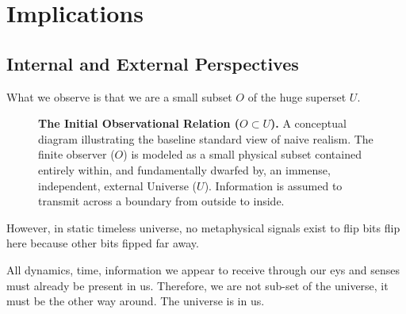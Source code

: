 \chapter{Implications}
\label{chap:implications}

\section{Internal and External Perspectives}

What we observe is that we are a small subset $O$ of  the huge superset $U$.

\begin{figure}[htbp]
\centering
{}
\caption{\textbf{The Initial Observational Relation ($O \subset U$).}
  A conceptual diagram illustrating the baseline standard view of naive realism.
  The finite observer ($O$) is modeled as a small physical subset contained entirely within, and fundamentally dwarfed by, an immense, independent, external Universe ($U$).
  Information is assumed to transmit across a boundary from outside to inside.}
\label{fig:diag1}
\end{figure}

\newpage

However, in static timeless universe, no metaphysical
signals exist to flip bits flip here because other bits fipped far away. 

All dynamics, time, information we appear to receive through our eys and senses
must already be present in us. Therefore, we are not sub-set
of the universe, it must be the other way around. The universe is in us. 

